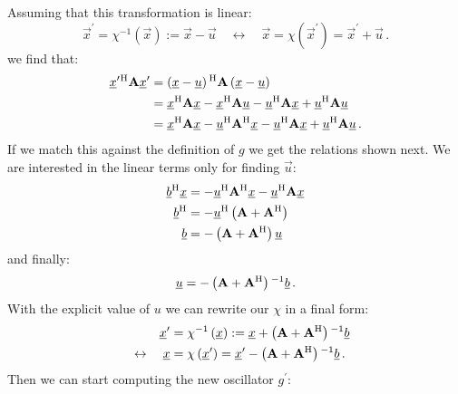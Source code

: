 \documentclass[a4paper,10pt]{article}
\begin{document}
Assuming that this transformation is linear:
\begin{equation}
 \vec{x}^{\prime} = \chi^{-1}\left(\vec{x}\right) := \vec{x} - \vec{u}
 \quad \leftrightarrow \quad
 \vec{x} = \chi\left(\vec{x}^{\prime}\right) = \vec{x}^{\prime} + \vec{u} \,.
\end{equation}
we find that:
\begin{equation}
\begin{split}
  \underline{x}^{\prime}{}^{\textnormal{H}} \mathbf{A} \underline{x}^{\prime}
  & = \left(\underline{x}-\underline{u}\right){}^{\textnormal{H}} \mathbf{A} \left(\underline{x}-\underline{u}\right) \\
  & = \underline{x}{}^{\textnormal{H}} \mathbf{A} \underline{x} - \underline{x}{}^{\textnormal{H}} \mathbf{A} \underline{u} -
      \underline{u}{}^{\textnormal{H}} \mathbf{A} \underline{x} + \underline{u}{}^{\textnormal{H}} \mathbf{A} \underline{u} \\
  & = \underline{x}{}^{\textnormal{H}} \mathbf{A} \underline{x} - \underline{u}{}^{\textnormal{H}} \mathbf{A}{}^{\textnormal{H}} \underline{x} -
      \underline{u}{}^{\textnormal{H}} \mathbf{A} \underline{x} + \underline{u}{}^{\textnormal{H}} \mathbf{A} \underline{u} \,.
\end{split}
\end{equation}
If we match this against the definition of $g$ we get the
relations shown next. We are interested in the linear terms
only for finding $\vec{u}$:
\begin{equation}
\begin{split}
  \underline{b}{}^{\textnormal{H}} \underline{x} & = - \underline{u}{}^{\textnormal{H}} \mathbf{A}{}^{\textnormal{H}} \underline{x} - \underline{u}{}^{\textnormal{H}} \mathbf{A} \underline{x} \\
  \underline{b}{}^{\textnormal{H}}         & = - \underline{u}{}^{\textnormal{H}} \left(\mathbf{A} + \mathbf{A}{}^{\textnormal{H}}\right) \\
  \underline{b}           & = - \left(\mathbf{A} + \mathbf{A}{}^{\textnormal{H}}\right) \underline{u} \\
\end{split}
\end{equation}
and finally:
\begin{equation}
  \underline{u} = - \left(\mathbf{A} + \mathbf{A}{}^{\textnormal{H}}\right){}^{-1} \underline{b} \,.
\end{equation}
With the explicit value of $u$ we can rewrite our $\chi$ in a final form:
\begin{equation} \label{eq:transform_chi}
\begin{split}
 \underline{x}^{\prime} & = \chi^{-1}\left(\underline{x}\right) := \underline{x} + \left(\mathbf{A} + \mathbf{A}{}^{\textnormal{H}}\right){}^{-1} \underline{b} \\
 \quad \leftrightarrow \quad
 \underline{x} & = \chi\left(\underline{x}^{\prime}\right) = \underline{x}^{\prime} - \left(\mathbf{A} + \mathbf{A}{}^{\textnormal{H}}\right){}^{-1} \underline{b} \,.
\end{split}
\end{equation}
Then we can start computing the new oscillator $g^{\prime}$:
\end{document}
